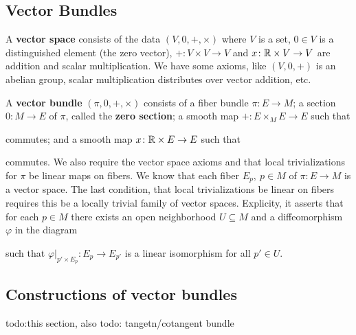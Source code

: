 \subsection{Vector Bundles}
\begin{definition}[]
    A \textbf{vector space} consists of the data $(V,0,+,\times )$ where $V$ is a set, $0 \in V$ is a distinguished element (the zero vector), $+ \colon V\times V \to V$ and $x \colon \mathbb{R}\times V \to V$ are addition and scalar multiplication. We have some axioms, like $(V,0,+)$ is an abelian group, scalar multiplication distributes over vector addition, etc.
\end{definition}

\begin{definition}
    A \textbf{vector bundle} $(\pi,0,+,\times )$ consists of a fiber bundle $\pi \colon E \to M$; a section $0 \colon M \to E$ of $\pi$, called the \textbf{zero section}; a smooth map $+ \colon E \times _M E \to E$ such that 
    \begin{figure}[H]
    \centering
    \end{figure} commutes; and a smooth map $x \colon \mathbb{R}\times  E\to E$ such that 
    \begin{figure}[H]
    \centering
    \end{figure} commutes. We also require the vector space axioms and that local trivializations for $\pi$ be linear maps on fibers. We know that each fiber $E_p, \ p \in M$ of $\pi \colon E \to M$ is a vector space. The last condition, that local trivializations be linear on fibers requires this be a locally trivial family of vector spaces. Explicity, it asserts that for each $p \in M$ there exists an open neighborhood $U \subseteq M$ and a diffeomorphism $\varphi $ in the diagram
    \begin{figure}[H]
    \centering
    \end{figure}such that $\varphi |_{p' \times E_p} \colon E_p \to E_{p'}$ is a linear isomorphism for all $p' \in U$.
\end{definition}

\subsection{Constructions of vector bundles}
{\color{red}todo:this section, also todo: tangetn/cotangent bundle} 

